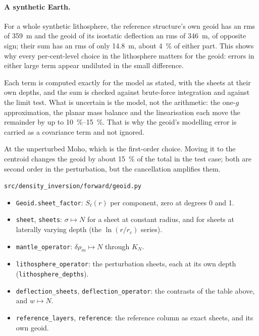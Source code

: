 \paragraph{A synthetic Earth.}
For a whole synthetic lithosphere, the reference structure's own geoid has an rms of \qty{359}{m} and the geoid of its isostatic deflection an rms of \qty{346}{m}, of opposite sign; their sum has an rms of only \qty{14.8}{m}, about \qty{4}{\percent} of either part.
This shows why every per-cent-level choice in the lithosphere matters for the geoid: errors in either large term appear undiluted in the small difference.

\begin{defence}
\A Each term is computed exactly for the model as stated, with the sheets at their own depths, and the sum is checked against brute-force integration and against the limit test.
What is uncertain is the model, not the arithmetic: the one-$g$ approximation, the planar mass balance and the linearisation each move the remainder by up to \qtyrange{10}{15}{\percent}.
That is why the geoid's modelling error is carried as a covariance term and not ignored.

\A At the unperturbed Moho, which is the first-order choice.
Moving it to the centroid changes the geoid by about \qty{15}{\percent} of the total in the test case; both are second order in the perturbation, but the cancellation amplifies them.
\end{defence}

\begin{incode}{\texttt{src/density\_inversion/forward/geoid.py}}
\begin{itemize}[nosep]
\item \texttt{Geoid.sheet\_factor}: $S_\ell(r)$ per component, zero at degrees 0 and 1.
\item \texttt{sheet}, \texttt{sheets}: $\sigma\mapsto N$ for a sheet at constant radius, and for sheets at laterally varying depth (the $\ln(r/r_c)$ series).
\item \texttt{mantle\_operator}: $\delta\rho_m\mapsto N$ through $K_N$.
\item \texttt{lithosphere\_operator}: the perturbation sheets, each at its own depth (\texttt{lithosphere\_depths}).
\item \texttt{deflection\_sheets}, \texttt{deflection\_operator}: the contrasts of the table above, and $w\mapsto N$.
\item \texttt{reference\_layers}, \texttt{reference}: the reference column as exact sheets, and its own geoid.
\end{itemize}
\end{incode}
